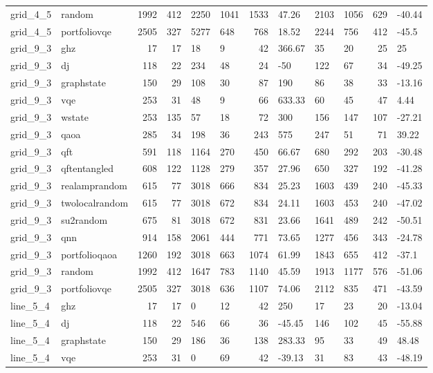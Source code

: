 \begin{longtable}{llrrllrlllrl}
grid\_4\_5 & random & 1992 & 412 & 2250 & 1041 & 1533 & 47.26 & 2103 & 1056 & 629 & -40.44 \\
grid\_4\_5 & portfoliovqe & 2505 & 327 & 5277 & 648 & 768 & 18.52 & 2244 & 756 & 412 & -45.5 \\
grid\_9\_3 & ghz & 17 & 17 & 18 & 9 & 42 & 366.67 & 35 & 20 & 25 & 25 \\
grid\_9\_3 & dj & 118 & 22 & 234 & 48 & 24 & -50 & 122 & 67 & 34 & -49.25 \\
grid\_9\_3 & graphstate & 150 & 29 & 108 & 30 & 87 & 190 & 86 & 38 & 33 & -13.16 \\
grid\_9\_3 & vqe & 253 & 31 & 48 & 9 & 66 & 633.33 & 60 & 45 & 47 & 4.44 \\
grid\_9\_3 & wstate & 253 & 135 & 57 & 18 & 72 & 300 & 156 & 147 & 107 & -27.21 \\
grid\_9\_3 & qaoa & 285 & 34 & 198 & 36 & 243 & 575 & 247 & 51 & 71 & 39.22 \\
grid\_9\_3 & qft & 591 & 118 & 1164 & 270 & 450 & 66.67 & 680 & 292 & 203 & -30.48 \\
grid\_9\_3 & qftentangled & 608 & 122 & 1128 & 279 & 357 & 27.96 & 650 & 327 & 192 & -41.28 \\
grid\_9\_3 & realamprandom & 615 & 77 & 3018 & 666 & 834 & 25.23 & 1603 & 439 & 240 & -45.33 \\
grid\_9\_3 & twolocalrandom & 615 & 77 & 3018 & 672 & 834 & 24.11 & 1603 & 453 & 240 & -47.02 \\
grid\_9\_3 & su2random & 675 & 81 & 3018 & 672 & 831 & 23.66 & 1641 & 489 & 242 & -50.51 \\
grid\_9\_3 & qnn & 914 & 158 & 2061 & 444 & 771 & 73.65 & 1277 & 456 & 343 & -24.78 \\
grid\_9\_3 & portfolioqaoa & 1260 & 192 & 3018 & 663 & 1074 & 61.99 & 1843 & 655 & 412 & -37.1 \\
grid\_9\_3 & random & 1992 & 412 & 1647 & 783 & 1140 & 45.59 & 1913 & 1177 & 576 & -51.06 \\
grid\_9\_3 & portfoliovqe & 2505 & 327 & 3018 & 636 & 1107 & 74.06 & 2112 & 835 & 471 & -43.59 \\
line\_5\_4 & ghz & 17 & 17 & 0 & 12 & 42 & 250 & 17 & 23 & 20 & -13.04 \\
line\_5\_4 & dj & 118 & 22 & 546 & 66 & 36 & -45.45 & 146 & 102 & 45 & -55.88 \\
line\_5\_4 & graphstate & 150 & 29 & 186 & 36 & 138 & 283.33 & 95 & 33 & 49 & 48.48 \\
line\_5\_4 & vqe & 253 & 31 & 0 & 69 & 42 & -39.13 & 31 & 83 & 43 & -48.19 \\

\end{longtable}
